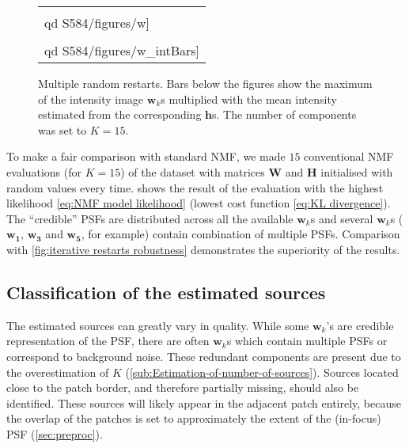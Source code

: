 \begin{figure}[!htb]
	\newcommand{\widthfig}{.95\textwidth}
	\newcommand{\barspace}{-.7cm}
	\centering
	\begin{tabular}{l}
		\texttt{[image: \\qd S584/figures/w]} \vspace{\barspace}\tabularnewline
		\texttt{[image: \\qd S584/figures/w\_intBars]}\tabularnewline
	\end{tabular}
	\caption{Multiple random restarts. Bars below the figures show the maximum of the intensity image $\bm{w}_k$s multiplied with the mean intensity estimated from the corresponding $\bm{h}$s. The number of components was set to $K=15$.}
	\label{fig:random restarts}
\end{figure}

To make a fair comparison with standard NMF, we made $15$ conventional NMF evaluations (for $K=15$) of the dataset with matrices $\bm{W}$ and $\bm{H}$ initialised with random values every time.  shows the result of the evaluation with the highest likelihood \autoref{eq:NMF model likelihood} (lowest cost function \autoref{eq:KL divergence}). The ``credible'' PSFs are distributed across all the available $\bm{w}_k$s and several $\bm{w}_k$s ($\bm{w_1}$, $\bm{w_3}$ and $\bm{w_5}$, for example) contain combination of multiple PSFs. Comparison with \autoref{fig:iterative restarts robustness}\aaa{} demonstrates the superiority of the \inmf{} results. 


\subsection{Classification of the estimated sources\label{sub:Classification-of-sources}}

The estimated sources can greatly vary in quality. While some $\bm{w}_k$'s are credible representation of the PSF, there are often $\bm{w}_k$s which contain multiple PSFs or correspond to background noise. These redundant components are present due to the overestimation of $K$ (\autoref{sub:Estimation-of-number-of-sources}). Sources located close to the patch border, and therefore partially missing, should also be identified. These sources will likely appear in the adjacent patch entirely, because the overlap of the patches is set to approximately the extent of the (in-focus) PSF (\autoref{sec:preproc}).

